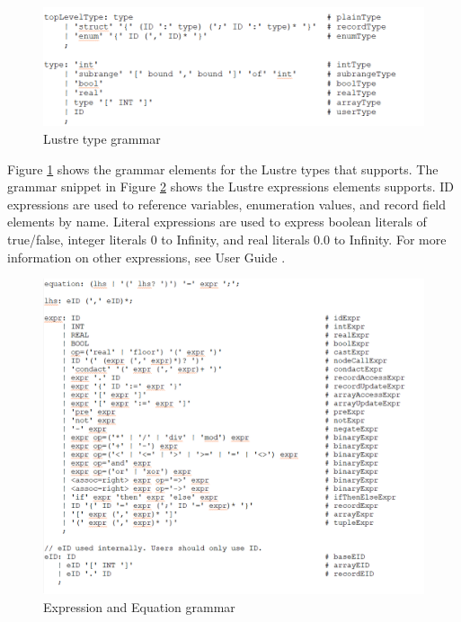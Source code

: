  \begin{figure}
 \centering
  \includegraphics[width=\textwidth]{figs/jk5.png}
  \caption{\jkind Lustre type grammar}
  \vspace{0.1in}
  \label{fig:jk5}
\end{figure}

Figure \ref{fig:jk5} shows the grammar elements for the Lustre types that \jkind supports. The grammar snippet in Figure \ref{fig:jk6} shows the Lustre expressions elements \jkind supports. ID expressions are used to reference variables, enumeration values, and record field elements by name. Literal expressions are used to express boolean literals of true/false, integer literals 0 to Infinity, and real literals 0.0 to Infinity. For more information on other expressions, see \jkind User Guide \cite{jkind}.

\begin{figure}
 \centering
  \includegraphics[width=\textwidth]{figs/jk6.png}
  \caption{\jkind Expression and Equation grammar}
  \vspace{0.1in}
  \label{fig:jk6}
\end{figure}

